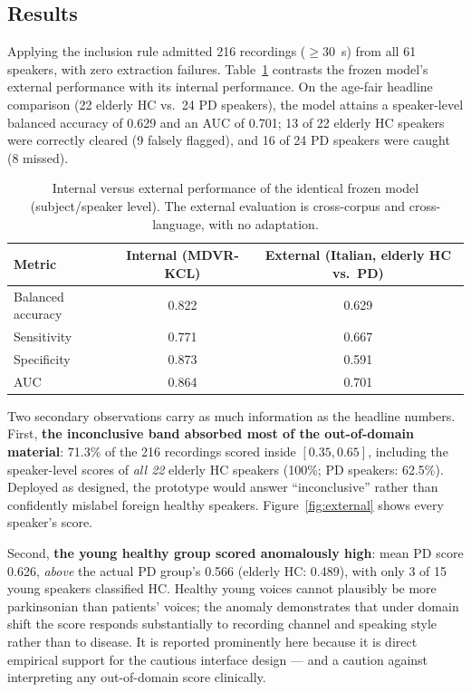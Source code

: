 \subsection{Results}

Applying the inclusion rule admitted 216 recordings ($\geq$30~s) from
all 61 speakers, with zero extraction failures.
Table~\ref{tab:external} contrasts the frozen model's external
performance with its internal performance. On the age-fair headline
comparison (22 elderly HC vs.\ 24 PD speakers), the model attains a
speaker-level balanced accuracy of 0.629 and an AUC of 0.701; 13 of 22
elderly HC speakers were correctly cleared (9 falsely flagged), and 16
of 24 PD speakers were caught (8 missed).

\begin{table}[htb]
\centering
\caption{Internal versus external performance of the identical frozen
model (subject/speaker level). The external evaluation is cross-corpus
and cross-language, with no adaptation.}
\label{tab:external}
\begin{tabular}{lcc}
\toprule
Metric & Internal (MDVR-KCL) & External (Italian, elderly HC vs.\ PD) \\
\midrule
Balanced accuracy & 0.822 & 0.629 \\
Sensitivity       & 0.771 & 0.667 \\
Specificity       & 0.873 & 0.591 \\
AUC               & 0.864 & 0.701 \\
\bottomrule
\end{tabular}
\end{table}

Two secondary observations carry as much information as the headline
numbers. First, \textbf{the inconclusive band absorbed most of the
out-of-domain material}: 71.3\% of the 216 recordings scored inside
$[0.35, 0.65]$, including the speaker-level scores of \emph{all 22}
elderly HC speakers (100\%; PD speakers: 62.5\%). Deployed as
designed, the prototype would answer ``inconclusive'' rather than
confidently mislabel foreign healthy speakers.
Figure~\ref{fig:external} shows every speaker's score.

Second, \textbf{the young healthy group scored anomalously high}: mean
PD score 0.626, \emph{above} the actual PD group's 0.566 (elderly HC:
0.489), with only 3 of 15 young speakers classified HC. Healthy young
voices cannot plausibly be more parkinsonian than patients' voices;
the anomaly demonstrates that under domain shift the score responds
substantially to recording channel and speaking style rather than to
disease. It is reported prominently here because it is direct
empirical support for the cautious interface design --- and a caution
against interpreting any out-of-domain score clinically.

